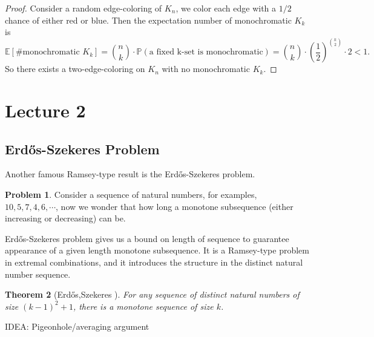 \documentclass{article}
\newtheorem{theorem}{Theorem}[section]
\theoremstyle{definition}
\newtheorem{problem}[theorem]{Problem}
\def\Erdos{Erd\H{o}s}
\begin{document}
\begin{proof}
    Consider a random edge-coloring of $K_{n}$, we color each edge with a $1/2$ chance of either red or blue. Then the expectation number of monochromatic $K_{k}$ is $$\mathbb{E}[\text{\# monochromatic } K_{k}]=\binom{n}{k}\cdot\mathbb{P}(\text{a fixed k-set is monochromatic})=\binom{n}{k}\cdot\left(\frac{1}{2}\right)^{\binom{k}{2}}\cdot 2<1.$$
    So there exists a two-edge-coloring on $K_{n}$ with no monochromatic $K_{k}$.
\end{proof}




\newpage

\section{Lecture 2}

\subsection{\Erdos{}-Szekeres Problem}

Another famous Ramsey-type result is the \Erdos{}-Szekeres problem.

\begin{problem}
     Consider a sequence of natural numbers, for examples, $10,5,7,4,6,\cdots$, now we wonder that how long a monotone subsequence (either increasing or decreasing) can be.
\end{problem}

\Erdos{}-Szekeres problem gives us a bound on length of sequence to guarantee appearance of a given length monotone subsequence. It is a Ramsey-type problem in extremal combinations, and it introduces the structure in the distinct natural number sequence. 

\begin{theorem}[\Erdos{},Szekeres \cite{Erdos-SzekeresThm}]
   For any sequence of distinct natural numbers of size $(k-1)^2+1$, there is a monotone sequence of size $k$.
\end{theorem}

IDEA: Pigeonhole/averaging argument
\end{document}
